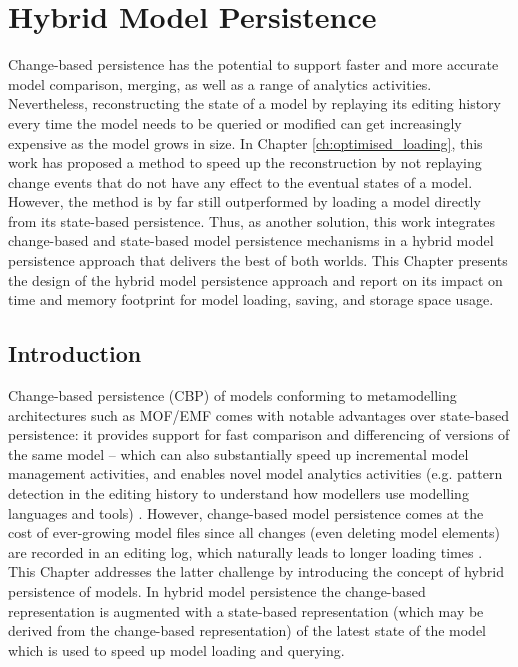 \chapter{Hybrid Model Persistence}
\label{ch:hybrid_model_persistence}

Change-based persistence has the potential to support faster and more accurate model comparison, merging, as well as a range of analytics activities. Nevertheless, reconstructing the state of a model by replaying its editing history every time the model needs to be queried or modified can get increasingly expensive as the model grows in size. In Chapter \ref{ch:optimised_loading}, this work has proposed a method to speed up the reconstruction by not replaying change events that do not have any effect to the eventual states of a model. However, the method is by far still outperformed by loading a model directly from its state-based persistence. Thus, as another solution, this work integrates change-based and state-based model persistence mechanisms in a hybrid model persistence approach that delivers the best of both worlds. This Chapter presents the design of the hybrid model persistence approach and report on its impact on time and memory footprint for model loading, saving, and storage space usage.

\section{Introduction}
\label{sec:introduction_5}
Change-based persistence (CBP) of models \cite{DBLP:conf/models/YohannisKP17} conforming to metamodelling architectures such as MOF/EMF \cite{omg2018mof,steinberg2008emf} comes with notable advantages over state-based persistence: it provides support for fast comparison and differencing of versions of the same model \cite{DBLP:conf/sde/LippeO92,DBLP:conf/caise/IgnatN05,DBLP:conf/edoc/KoegelHLHD10,koegel2010emfstore} -- which can also substantially speed up incremental model management activities, and enables novel model analytics activities (e.g. pattern detection in the editing history to understand how modellers use modelling languages and tools) \cite{DBLP:journals/entcs/RobbesL07}. However, change-based model persistence comes at the cost of ever-growing model files \cite{DBLP:conf/edoc/KoegelHLHD10,DBLP:journals/entcs/RobbesL07} since all changes (even deleting model elements) are recorded in an editing log, which naturally leads to longer loading times \cite{mens2002state}. This Chapter addresses the latter challenge by introducing the concept of hybrid persistence of models. In hybrid model persistence the change-based representation is augmented with a state-based representation (which may be derived from the change-based representation) of the latest state of the model which is used to speed up model loading and querying.

